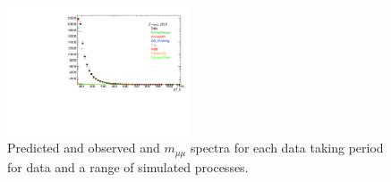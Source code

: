 \begin{figure}[p]
\includegraphics[width=0.48\textwidth,page=12]{figures/nonZjj_bkg_plots_VBFZ.pdf}
\caption{Predicted and observed \ptll{} and $m_{\mu\mu}$ spectra for each data taking period for data and a range of simulated processes.}
\label{fig:bkgProcesses}
\end{figure}





